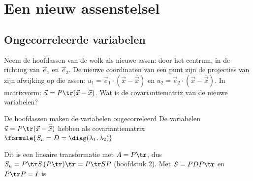 
\begin{oefeningen}
\end{oefeningen}

\section{Een nieuw assenstelsel}

\subsection{Ongecorreleerde variabelen}

Neem de hoofdassen van de wolk als nieuwe assen: door het centrum, in de richting van $\vec e_1$ en $\vec e_2$. De nieuwe coördinaten van een punt zijn de projecties van zijn afwijking op die assen: $u_1 = \vec e_1 \cdot (\vec x - \overline{\vec x})$ en $u_2 = \vec e_2 \cdot (\vec x - \overline{\vec x})$. In matrixvorm: $\vec u = P\tr(\vec x - \overline{\vec x})$. Wat is de covariantiematrix van de nieuwe variabelen?

\begin{theorie}
\begin{stelling}{De hoofdassen maken de variabelen ongecorreleerd}
De variabelen $\vec u = P\tr(\vec x - \overline{\vec x})$ hebben als covariantiematrix \qquad $\formule{S_u = D = \diag(\lambda_1, \lambda_2)}$
\end{stelling}

\begin{bewijs}
Dit is een lineaire transformatie met $A = P\tr$, dus $S_u = P\tr S\,(P\tr)\tr = P\tr S P$ (hoofdstuk 2). Met $S = PDP\tr$ en $P\tr P = I$ is
\end{bewijs}
\end{theorie}

